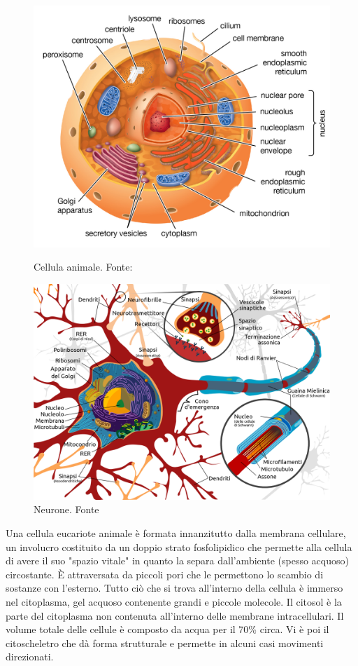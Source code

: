 \begin{figure}[!htb]
	\centering
	\includegraphics[scale=0.14]{images/cellula-eucariotica2.png}
	\caption{Cellula animale. Fonte: \cite{eukaryoteBritannica}}
	\label{fig:cellula-animale}
	\endminipage\hfill
	\centering
	\includegraphics[scale=0.155]{images/neurone.png}
	\caption{Neurone. Fonte \cite{neuroneWiki}}
	\label{fig:neurone}
	\endminipage\hfill
\end{figure}

Una cellula eucariote animale è formata innanzitutto dalla membrana cellulare, un involucro costituito da un doppio strato fosfolipidico che permette alla cellula di avere il suo "spazio vitale" in quanto la separa dall'ambiente (spesso acquoso) circostante. È attraversata da piccoli pori che le permettono lo scambio di sostanze con l'esterno. Tutto ciò che si trova all'interno della cellula è immerso nel citoplasma, gel acquoso contenente grandi e piccole molecole. Il citosol è la parte del citoplasma non contenuta all'interno delle membrane intracellulari. Il volume totale delle cellule è composto da acqua per il 70\% circa. Vi è poi il citoscheletro che dà forma strutturale e permette in alcuni casi movimenti direzionati. 

